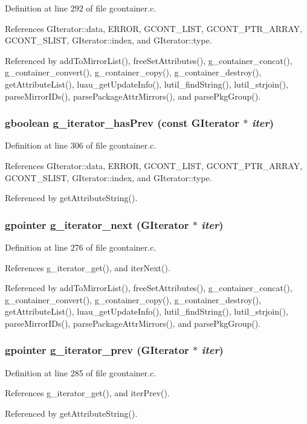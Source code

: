 Definition at line 292 of file gcontainer.c.

References GIterator::data, ERROR, GCONT\_\-LIST, GCONT\_\-PTR\_\-ARRAY, GCONT\_\-SLIST, GIterator::index, and GIterator::type.

Referenced by add\-To\-Mirror\-List(), free\-Set\-Attributes(), g\_\-container\_\-concat(), g\_\-container\_\-convert(), g\_\-container\_\-copy(), g\_\-container\_\-destroy(), get\-Attribute\-List(), luau\_\-get\-Update\-Info(), lutil\_\-find\-String(), lutil\_\-strjoin(), parse\-Mirror\-IDs(), parse\-Package\-Attr\-Mirrors(), and parse\-Pkg\-Group().
\subsubsection{\setlength{\rightskip}{0pt plus 5cm}gboolean g\_\-iterator\_\-has\-Prev (const {\bf GIterator} $\ast$ {\em iter})}\label{gcontainer_8h_a19}




Definition at line 306 of file gcontainer.c.

References GIterator::data, ERROR, GCONT\_\-LIST, GCONT\_\-PTR\_\-ARRAY, GCONT\_\-SLIST, GIterator::index, and GIterator::type.

Referenced by get\-Attribute\-String().
\subsubsection{\setlength{\rightskip}{0pt plus 5cm}gpointer g\_\-iterator\_\-next ({\bf GIterator} $\ast$ {\em iter})}\label{gcontainer_8h_a16}




Definition at line 276 of file gcontainer.c.

References g\_\-iterator\_\-get(), and iter\-Next().

Referenced by add\-To\-Mirror\-List(), free\-Set\-Attributes(), g\_\-container\_\-concat(), g\_\-container\_\-convert(), g\_\-container\_\-copy(), g\_\-container\_\-destroy(), get\-Attribute\-List(), luau\_\-get\-Update\-Info(), lutil\_\-find\-String(), lutil\_\-strjoin(), parse\-Mirror\-IDs(), parse\-Package\-Attr\-Mirrors(), and parse\-Pkg\-Group().
\subsubsection{\setlength{\rightskip}{0pt plus 5cm}gpointer g\_\-iterator\_\-prev ({\bf GIterator} $\ast$ {\em iter})}\label{gcontainer_8h_a17}




Definition at line 285 of file gcontainer.c.

References g\_\-iterator\_\-get(), and iter\-Prev().

Referenced by get\-Attribute\-String().